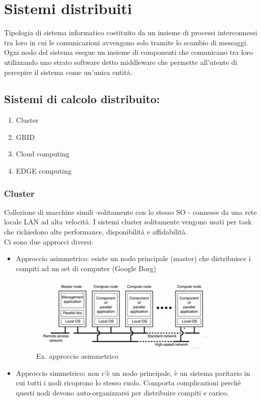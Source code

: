 \documentclass[12pt,italian]{report}
\begin{document}
\chapter{Sistemi distribuiti}
\label{cap:sistemi distribuiti}
Tipologia di sistema informatico costituito da un insieme di processi interconnessi tra loro in cui le comunicazioni avvengono solo tramite lo scambio di messaggi. Ogni nodo del sistema esegue un insieme di componenti che comunicano tra loro utilizzando uno strato software detto middleware che permette all'utente di percepire il sistema come un'unica entità. 
\section{Sistemi di calcolo distribuito:}
\label{sec:tipologie}
\begin{enumerate}
    \item Cluster
    \item GRID
    \item Cloud computing
    \item EDGE computing
\end{enumerate}

\subsection{Cluster}
\label{sec: cloud comp}
Collezione di macchine simili -solitamente con lo stesso SO - connesse da una rete locale LAN ad alta velocità. I sistemi cluster solitamente vengono usati per task che richiedono alte performance, disponibilità e affidabilità. \\ Ci sono due approcci diversi:
\begin{itemize}
    \item Approccio asimmetrico: esiste un nodo principale (master) che distribuisce i compiti ad un set di computer (Google Borg)
    \begin{figure}[h]
	\centering
    \includegraphics[width=90mm]{img/cluster.png}
    \caption{Ex. approccio asimmetrico}
    \label{fig:asimm}
    \end{figure}
    \item Approccio simmetrico: non c'è un nodo principale, è un sistema paritario in cui tutti i nodi ricoprono lo stesso ruolo. Comporta complicazioni perché questi nodi devono auto-organizzarsi per distribuire compiti e carico. 
\end{itemize}
\end{document}
